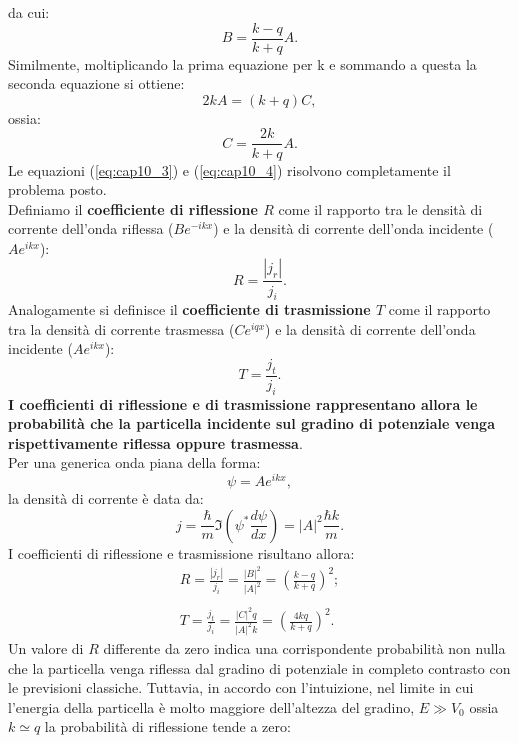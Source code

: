 \documentclass[a4paper,12pt,twoside]{book}
\begin{document}
da cui:
\begin{equation}
B= \frac{k-q}{k+q}A.
\label{eq:cap10_3}
\end{equation}
Similmente, moltiplicando la prima equazione per k e sommando a questa la seconda equazione si ottiene:
\begin{equation}
2kA=\left( k+q \right)C,
\end{equation}
ossia:
\begin{equation}
C=\frac{2k}{k+q}A.
\label{eq:cap10_4}
\end{equation}
Le equazioni (\ref{eq:cap10_3}) e (\ref{eq:cap10_4}) risolvono completamente il problema posto.\\
Definiamo il \textbf{coefficiente di riflessione $R$} come il rapporto tra le densità di corrente dell'onda riflessa ($\displaystyle{Be^{-ikx}}$) e la densità di corrente dell'onda incidente ($\displaystyle{Ae^{ikx}}$):
\begin{equation}
R=\frac{|j_r|}{j_i}.
\end{equation}
Analogamente si definisce il \textbf{coefficiente di trasmissione $T$} come il rapporto tra la densità di corrente trasmessa ($\displaystyle{Ce^{iqx}}$) e la densità di corrente dell'onda incidente ($\displaystyle{Ae^{ikx}}$):
\begin{equation}
T=\frac{j_t}{j_i}.
\end{equation}
\textbf{I coefficienti di riflessione e di trasmissione rappresentano allora le probabilità che la particella incidente sul gradino di potenziale venga rispettivamente riflessa oppure trasmessa}.\\
Per una generica onda piana della forma:
\begin{equation}
\psi= Ae^{ikx},
\end{equation}
la densità di corrente è data da:
\begin{equation}
j=\frac{\hbar}{m}\Im \left(\psi ^* \frac{d\psi}{dx} \right)= |A|^2\frac{\hbar k}{m}.
\end{equation}
I coefficienti di riflessione e trasmissione risultano allora:
\begin{eqnarray}
R=\frac{|j_r|}{j_i}= \frac{|B|^2}{|A|^2}=\left(\frac{k-q}{k+q}\right)^2;\nonumber \\
\\
T=\frac{j_t}{j_i}= \frac{|C|^2 q}{|A|^2 k}=\left(\frac{4kq}{k+q}\right)^2.\nonumber 
\end{eqnarray}
Un valore di $R$ differente da zero indica una corrispondente probabilità non nulla che la particella venga riflessa dal gradino di potenziale in completo contrasto con le previsioni classiche. Tuttavia, in accordo con l'intuizione, nel limite in cui l'energia della particella è molto maggiore dell'altezza del gradino, $E\gg V_0$ ossia $k\simeq q$ la probabilità di riflessione tende a zero:
\end{document}
